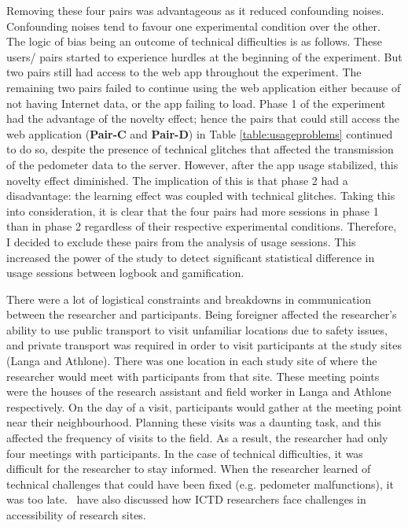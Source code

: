 Removing these four pairs was advantageous as it reduced confounding noises. Confounding noises  tend to favour one experimental condition over the other. The logic of bias being an outcome of technical difficulties is as follows. These users/ pairs started to experience hurdles at the beginning of the experiment. But two pairs still had access to the web app throughout the experiment. The remaining two pairs failed to continue using the web application either because of not having Internet data, or the app failing to load. Phase 1 of the experiment had the advantage of the novelty effect; hence the pairs that could still access the web application (\textbf{Pair-C} and \textbf{Pair-D}) in Table \ref{table:usageproblems} continued to do so, despite the presence of technical glitches that affected the transmission of the pedometer data to the server. However, after the app usage stabilized, this novelty effect diminished. The implication of this is that phase 2  had a disadvantage: the learning effect was coupled with technical glitches. Taking this into consideration, it is clear that the four pairs had more sessions in phase 1 than in phase 2 regardless of their respective experimental conditions. Therefore, I decided to exclude these pairs from the analysis of usage sessions. This increased the power of the study to detect significant statistical difference in usage sessions between logbook and gamification.

There were a lot of logistical constraints and breakdowns in communication between the researcher and participants. Being foreigner affected the researcher's ability to use public transport to visit unfamiliar locations due to safety issues, and private transport was required in order to visit participants at the study sites (Langa and Athlone). There was one location in each study site of where the researcher would meet with participants from that site. These meeting points were the houses of the research assistant and field worker in Langa and Athlone respectively. On the day of a visit, participants would gather at the meeting point near their neighbourhood. Planning these visits was a daunting task, and this affected the frequency of visits to the field.  As a result, the researcher had only four meetings with participants. In the case of technical difficulties, it was difficult for the researcher to stay informed. When the researcher learned of technical challenges that could have been fixed (e.g. pedometer malfunctions), it was too late.~\cite{anokwa2009stories} have also discussed how ICTD researchers face challenges in accessibility of research sites.  
